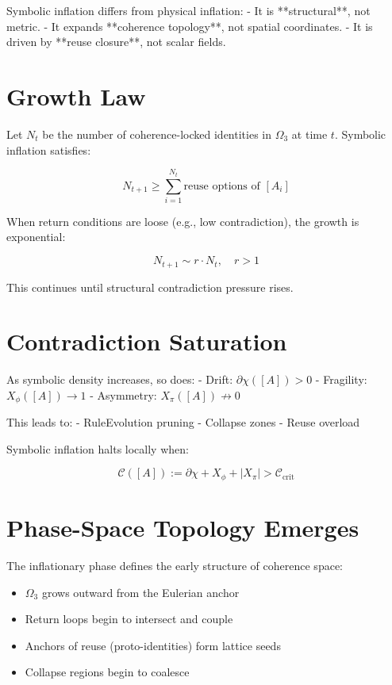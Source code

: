 Symbolic inflation differs from physical inflation:
- It is **structural**, not metric.
- It expands **coherence topology**, not spatial coordinates.
- It is driven by **reuse closure**, not scalar fields.

\section{Growth Law}

Let $N_t$ be the number of coherence-locked identities in $\Omega_3$ at time $t$. Symbolic inflation satisfies:

\[
N_{t+1} \geq \sum_{i=1}^{N_t} \text{reuse options of } [A_i]
\]

When return conditions are loose (e.g., low contradiction), the growth is exponential:

\[
N_{t+1} \sim r \cdot N_t, \quad r > 1
\]

This continues until structural contradiction pressure rises.

\section{Contradiction Saturation}

As symbolic density increases, so does:
- Drift: $\partial \chi([A]) > 0$
- Fragility: $X_\phi([A]) \to 1$
- Asymmetry: $X_\pi([A]) \not\to 0$

This leads to:
- RuleEvolution pruning
- Collapse zones
- Reuse overload

\begin{definition}
Symbolic inflation halts locally when:

\[
\mathcal{C}([A]) := \partial \chi + X_\phi + |X_\pi| > \mathcal{C}_{\text{crit}}
\]
\end{definition}

\section{Phase-Space Topology Emerges}

The inflationary phase defines the early structure of coherence space:

\begin{itemize}
  \item $\Omega_3$ grows outward from the Eulerian anchor
  \item Return loops begin to intersect and couple
  \item Anchors of reuse (proto-identities) form lattice seeds
  \item Collapse regions begin to coalesce
\end{itemize}


